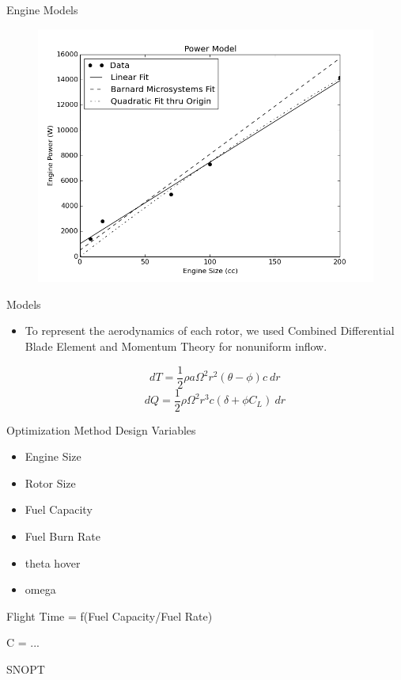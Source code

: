 \documentclass{beamer}
\begin{document}
\begin{frame}{Engine Models}	
	\begin{figure}
		\begin{center}
			\includegraphics[width=.70\textwidth]{../max_power.png}
			\label{fig:eng_power}
		\end{center}
	\end{figure}
	
\end{frame}

\begin{frame}{Models}
	\begin{itemize}
		\item{To represent the aerodynamics of each rotor, we used Combined Differential Blade Element and Momentum Theory for nonuniform inflow.}
		\begin{center}
		$$ dT = \frac{1}{2} \rho a \Omega^2 r^2 (\theta - \phi) c \  dr $$
		$$ dQ = \frac{1}{2} \rho \Omega^2 r^3 c (\delta + \phi C_L) \ dr $$
		\end{center}
	\end{itemize}

\end{frame}

\begin{frame}{Optimization Method}
	Design Variables
	\begin{itemize}
		\item{Engine Size}
		\item{Rotor Size}
		\item{Fuel Capacity}
		\item{Fuel Burn Rate}
		\item{theta hover}
		\item{omega}
	\end{itemize}
	
	Flight Time = f(Fuel Capacity/Fuel Rate)
	
	C = ...
	
	SNOPT
\end{frame}
\end{document}
